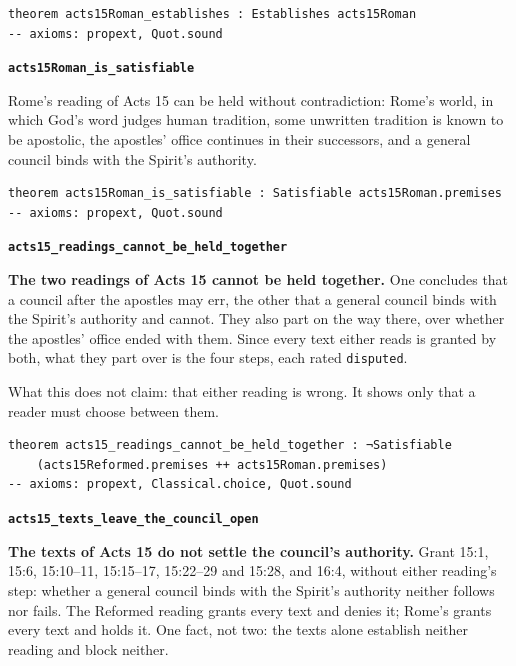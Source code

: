 \documentclass[11pt]{article}
\begin{document}
{\small\begin{verbatim}
theorem acts15Roman_establishes : Establishes acts15Roman
-- axioms: propext, Quot.sound
\end{verbatim}}
\par\medskip\noindent\textbf{\texttt{acts15\allowbreak{}Roman\_\allowbreak{}is\_\allowbreak{}satisfiable}}\par\nobreak\noindent
Rome’s reading of Acts 15 can be held without contradiction: Rome’s world, in which God’s word judges human tradition, some unwritten tradition is known to be apostolic, the apostles’ office continues in their successors, and a general council binds with the Spirit’s authority.

{\small\begin{verbatim}
theorem acts15Roman_is_satisfiable : Satisfiable acts15Roman.premises
-- axioms: propext, Quot.sound
\end{verbatim}}
\par\medskip\noindent\textbf{\texttt{acts15\_\allowbreak{}readings\_\allowbreak{}cannot\_\allowbreak{}be\_\allowbreak{}held\_\allowbreak{}together}}\par\nobreak\noindent
\textbf{The two readings of Acts 15 cannot be held together.} One concludes that a council after the apostles may err, the other that a general council binds with the Spirit’s authority and cannot. They also part on the way there, over whether the apostles’ office ended with them. Since every text either reads is granted by both, what they part over is the four steps, each rated \texttt{disputed}.

What this does not claim: that either reading is wrong. It shows only that a reader must choose between them.

{\small\begin{verbatim}
theorem acts15_readings_cannot_be_held_together : ¬Satisfiable
    (acts15Reformed.premises ++ acts15Roman.premises)
-- axioms: propext, Classical.choice, Quot.sound
\end{verbatim}}
\par\medskip\noindent\textbf{\texttt{acts15\_\allowbreak{}texts\_\allowbreak{}leave\_\allowbreak{}the\_\allowbreak{}council\_\allowbreak{}open}}\par\nobreak\noindent
\textbf{The texts of Acts 15 do not settle the council’s authority.} Grant 15:1, 15:6, 15:10–11, 15:15–17, 15:22–29 and 15:28, and 16:4, without either reading’s step: whether a general council binds with the Spirit’s authority neither follows nor fails. The Reformed reading grants every text and denies it; Rome’s grants every text and holds it. One fact, not two: the texts alone establish neither reading and block neither.
\end{document}
